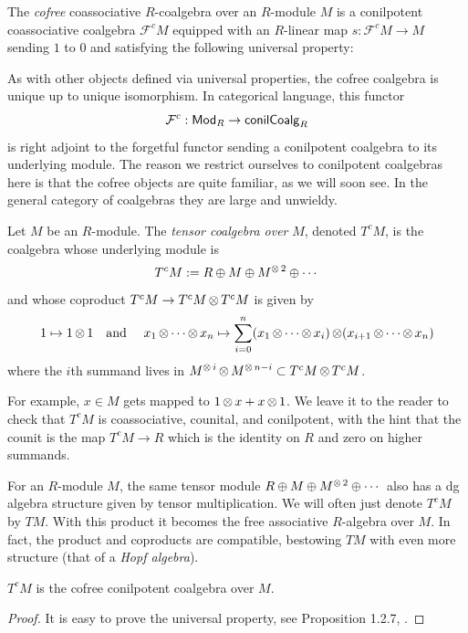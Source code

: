 \begin{defn}
The \emph{cofree} coassociative $R$-coalgebra over an $R$-module $M$ is a conilpotent coassociative coalgebra $\mathcal{F}^cM$ equipped with an $R$-linear map $s: \mathcal{F}^cM\to M$ sending $1$ to $0$ and satisfying the following universal property: 
\end{defn}
As with other objects defined via universal properties, the cofree coalgebra is unique up to unique isomorphism. In categorical language, this functor
\[\mathcal{F}^c: \mathsf{Mod}_R\to \mathsf{conilCoalg}_R\]
is right adjoint to the forgetful functor sending a conilpotent coalgebra to its underlying module. The reason we restrict ourselves to conilpotent coalgebras here is that the cofree objects are quite familiar, as we will soon see. In the general category of coalgebras they are large and unwieldy. 

\begin{defn} 
    Let $M$ be an $R$-module. The \emph{tensor coalgebra over} $M$, denoted $T^cM$, is the coalgebra whose underlying module is 
    \[T^cM := R\oplus M \oplus M^{\operatorname{\otimes} 2} \oplus \cdots\]
    and whose coproduct $T^cM \to T^cM\operatorname{\otimes} T^cM$ is given by
    \[1\mapsto 1\operatorname{\otimes} 1\text{\quad and \quad} x_1\operatorname{\otimes} \cdots \operatorname{\otimes} x_n \mapsto \sum_{i=0}^n (x_1 \operatorname{\otimes} \cdots \operatorname{\otimes} x_i)\operatorname{\otimes} (x_{i+1}\operatorname{\otimes} \cdots \operatorname{\otimes} x_n)\]
	where the $i$th summand lives in $M^{\operatorname{\otimes} i} \operatorname{\otimes} M^{\operatorname{\otimes} n-i} \subset T^cM\operatorname{\otimes} T^cM$.
\end{defn}
For example, $x \in M$ gets mapped to $1\operatorname{\otimes} x + x\operatorname{\otimes} 1$. We leave it to the reader to check that $T^cM$ is coassociative, counital, and conilpotent, with the hint that the counit is the map $T^cM \to R$ which is the identity on $R$ and zero on higher summands.
\begin{rem}
For an $R$-module $M$, the same tensor module $R\oplus M\oplus M^{\operatorname{\otimes} 2}\oplus \cdots$ also has a dg algebra structure given by tensor multiplication. We will often just denote $T^cM$ by $TM$. With this product it becomes the free associative $R$-algebra over $M$. In fact, the product and coproducts are compatible, bestowing $TM$ with even more structure (that of a \emph{Hopf algebra}).
\end{rem}

\begin{prop}
    $T^cM$ is the cofree conilpotent coalgebra over $M$.
    \begin{proof}
        It is easy to prove the universal property, see Proposition 1.2.7, \cite{Loday2012}.
    \end{proof}
\end{prop}

